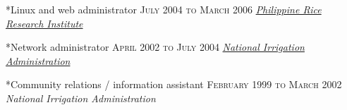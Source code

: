 \documentclass[10pt, a4paper, final]{article}
\begin{document}
\begin{minipage}[t]{0.65\linewidth}
\begin{section}
    \begin{subsection}*{Linux and web administrator \hfill\textsc{July 2004 to March 2006}}
      \href{http://www.philrice.gov.ph}{\textit{Philippine Rice Research Institute}}  
    \end{subsection}
    \vspace{1em}
  
    \begin{subsection}*{Network administrator \hfill\textsc{April 2002 to July 2004}}
      \href{http://www.nia.gov.ph}{\textit{National Irrigation Administration}}  
    \end{subsection}
    \vspace{1em}
  
    \begin{subsection}*{Community relations / information assistant \hfill\textsc{February 1999 to March 2002}}
      \textit{National Irrigation Administration} 
    \end{subsection}
    \vspace{1em}
  \end{section}
\end{minipage}
\end{document}
